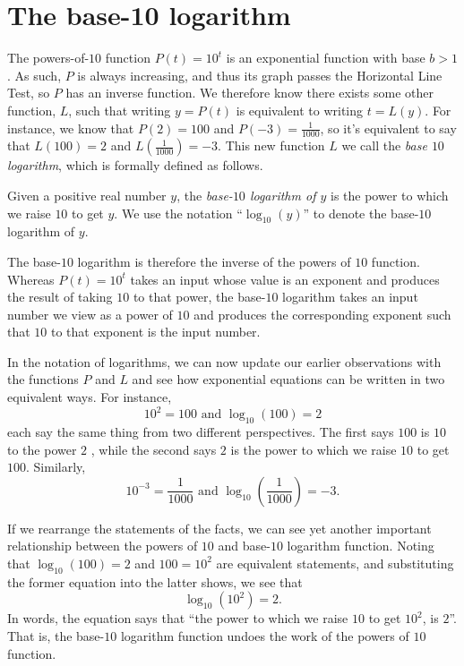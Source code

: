 \documentclass[nooutcomes]{ximera}
\begin{document}
\section{The base-10 logarithm}

The powers-of-\(10\) function \(P(t) = 10^t\) is an exponential function with base \(b \gt 1\).  As such, \(P\) is always increasing, and thus its graph passes the Horizontal Line Test, so \(P\) has an inverse function.  We therefore know there exists some other function, \(L\), such that writing \(y = P(t)\) is equivalent to writing \(t = L(y)\).  For instance, we know that \(P(2)=100\) and \(P(-3)=\frac{1}{1000}\), so it's equivalent to say that \(L(100) = 2\) and \(L\left(\frac{1}{1000}\right) = -3\).  This new function \(L\) we call the \emph{base \(10\) logarithm}, which is formally defined as follows.%

Given a positive real number \(y\), the \emph{base-\(10\) logarithm of \(y\)} is the power to which we raise \(10\) to get \(y\).  We use the notation ``\(\log_{10}(y)\)'' to denote the base-\(10\) logarithm of \(y\).%

The base-\(10\) logarithm is therefore the inverse of the powers of \(10\) function.  Whereas \(P(t) = 10^t\) takes an input whose value is an exponent and produces the result of taking \(10\) to that power, the base-\(10\) logarithm takes an input number we view as a power of \(10\) and produces the corresponding exponent such that \(10\) to that exponent is the input number.%

In the notation of logarithms, we can now update our earlier observations with the functions \(P\) and \(L\) and see how exponential equations can be written in two equivalent ways.  For instance,%
\begin{equation*}
10^2 = 100 \text{ and } \log_{10}(100) = 2\label{eq-exp-log-base-10-2}
\end{equation*}
each say the same thing from two different perspectives.  The first says \(100\) is \(10\) to the power \(2\) , while the second says \(2\) is the power to which we raise \(10\) to get \(100\).  Similarly,%
\begin{equation*}
10^{-3} = \frac{1}{1000} \text{ and } \log_{10} \left( \frac{1}{1000} \right) = -3\text{.}\label{eq-exp-log-base-10-minus-3}
\end{equation*}

If we rearrange the statements of the facts, we can see yet another important relationship between the powers of \(10\) and base-\(10\) logarithm function.  Noting that \(\log_{10}(100) = 2\) and \(100 = 10^2\) are equivalent statements, and substituting the former equation into the latter shows, we see that%
\begin{equation*}
\log_{10}(10^2) = 2\text{.}
\end{equation*}
In words, the equation says that ``the power to which we raise \(10\) to get \(10^2\), is \(2\)''.  That is, the base-\(10\) logarithm function undoes the work of the powers of \(10\) function.%
\end{document}
